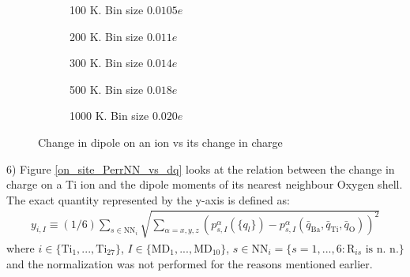\documentclass[11pt, a4paper]{report}
\begin{document}
\begin{figure}[h!]
\centering
	\begin{subfigure}[b]{0.45\textwidth}
	\hspace*{-0.4cm}
	
	\vspace*{-0.4cm}
	\caption{100 K. Bin size $0.0105e$}
	\end{subfigure}
	\hspace{0.6cm}
	\begin{subfigure}[b]{0.45\textwidth}
	\hspace*{-0.4cm}
	
	\vspace*{-0.4cm}
	\caption{200 K. Bin size $0.011e$}
	\end{subfigure}
	\quad
	\begin{subfigure}[b]{0.45\textwidth}
	\hspace*{-0.4cm}
	
    \vspace*{-0.4cm}
	\caption{300 K. Bin size $0.014e$}
	\end{subfigure}
	\hspace{0.6cm}
	\begin{subfigure}[b]{0.45\textwidth}
	\hspace*{-0.4cm}
	
    \vspace*{-0.4cm}
	\caption{500 K. Bin size $0.018e$}
	\end{subfigure}
	\quad
	\begin{subfigure}[b]{0.45\textwidth}
	\hspace*{-0.4cm}
	
    \vspace*{-0.4cm}
	\caption{1000 K. Bin size $0.020e$}
	\end{subfigure}
\caption{Change in dipole on an ion vs its change in charge}
\label{on_site_Perr_vs_dq}
\end{figure}

6) Figure \ref{on_site_PerrNN_vs_dq} looks at the relation between the change in charge on a Ti ion and the dipole moments of its nearest neighbour Oxygen shell. The exact quantity represented by the y-axis is defined as:
\begin{align*}
y_{i,I} \equiv (1/6)\sum_{s\in \text{NN}_i}\sqrt{\sum_{\alpha = x,y,z}\left(p_{s,I}^{\alpha}(\{q_l\})-p_{s,I}^{\alpha}(\bar{q}_{\text{Ba}},\bar{q}_{\text{Ti}},\bar{q}_{\text{O}})\right)^2}
\end{align*}
where $i\in \{\text{Ti}_1,...,\text{Ti}_{27}\}$, $I\in\{\text{MD}_1,...,\text{MD}_{10}\}$, $s\in\text{NN}_i=\{s=1,...,6 : \text{R}_{is} \text{ is n. n.}\}$ and the normalization was not performed for the reasons mentioned earlier. 
\end{document}
